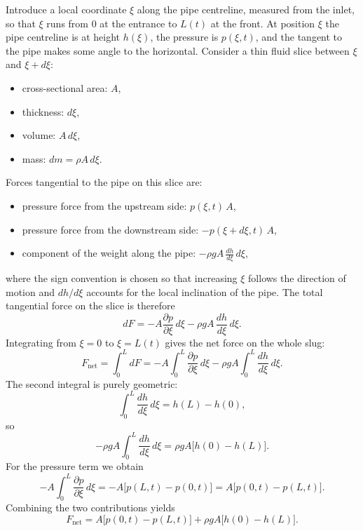 \documentclass[11pt]{article}
\begin{document}
Introduce a local coordinate $\xi$ along the pipe centreline, measured from the inlet, so that
$\xi$ runs from $0$ at the entrance to $L(t)$ at the front. At position $\xi$ the pipe
centreline is at height $h(\xi)$, the pressure is $p(\xi,t)$, and the tangent to the pipe makes
some angle to the horizontal. Consider a thin fluid slice between $\xi$ and $\xi + d\xi$:
\begin{itemize}
  \item cross-sectional area: $A$,
  \item thickness: $d\xi$,
  \item volume: $A\,d\xi$,
  \item mass: $dm = \rho A\,d\xi$.
\end{itemize}
Forces tangential to the pipe on this slice are:
\begin{itemize}
  \item pressure force from the upstream side: $p(\xi,t)\,A$,
  \item pressure force from the downstream side: $-p(\xi + d\xi,t)\,A$,
  \item component of the weight along the pipe: $-\rho g A\,\frac{dh}{d\xi}\,d\xi$,
\end{itemize}
where the sign convention is chosen so that increasing $\xi$ follows the direction of motion
and $dh/d\xi$ accounts for the local inclination of the pipe. The total tangential force on the
slice is therefore
\[
  dF = -A\frac{\partial p}{\partial \xi}\,d\xi - \rho g A\,\frac{dh}{d\xi}\,d\xi.
\]
Integrating from $\xi = 0$ to $\xi = L(t)$ gives the net force on the whole slug:
\[
  F_{\text{net}}
  = \int_0^{L} dF
  = -A\int_0^{L}\frac{\partial p}{\partial \xi}\,d\xi
    - \rho g A \int_0^{L}\frac{dh}{d\xi}\,d\xi.
\]
The second integral is purely geometric:
\[
  \int_0^{L} \frac{dh}{d\xi}\,d\xi = h(L) - h(0),
\]
so
\[
  -\rho g A \int_0^{L} \frac{dh}{d\xi}\,d\xi
  = \rho g A\bigl[h(0) - h(L)\bigr].
\]
For the pressure term we obtain
\[
  -A\int_0^{L}\frac{\partial p}{\partial \xi}\,d\xi
  = -A\bigl[p(L,t) - p(0,t)\bigr]
  = A\bigl[p(0,t) - p(L,t)\bigr].
\]
Combining the two contributions yields
\[
  F_{\text{net}} = A\bigl[p(0,t) - p(L,t)\bigr]
                  + \rho g A\bigl[h(0) - h(L)\bigr].
\]
\end{document}

